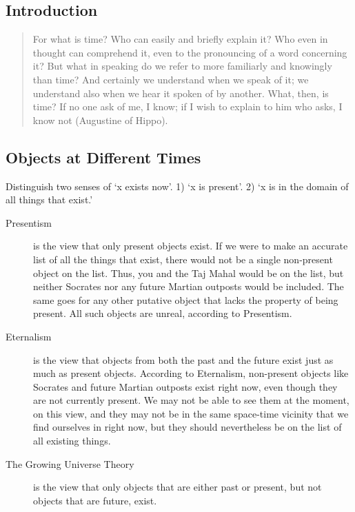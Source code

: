 \documentclass[oneside]{article}
\begin{document}
\thispagestyle{fancy}

\subsection*{Introduction}

\begin{quote}
For what is time? Who can easily and briefly explain it? Who even in thought can comprehend it, even to the pronouncing of a word concerning it? But what in speaking do we refer to more familiarly and knowingly than time? And certainly we understand when we speak of it; we understand also when we hear it spoken of by another. What, then, is time? If no one ask of me, I know; if I wish to explain to him who asks, I know not (Augustine of Hippo). 
\end{quote}

\subsection*{Objects at Different Times}

Distinguish two senses of `x exists now'. 1) `x is present'. 2) `x is in the domain of all things that exist.' 

\begin{description}
\item[Presentism] is the view that only present objects exist. If we were to make an accurate list of all the things that exist, there would not be a single non-present object on the list. Thus, you and the Taj Mahal would be on the list, but neither Socrates nor any future Martian outposts would be included. The same goes for any other putative object that lacks the property of being present. All such objects are unreal, according to Presentism.
\item[Eternalism] is the view that objects from both the past and the future exist just as much as present objects. According to Eternalism, non-present objects like Socrates and future Martian outposts exist right now, even though they are not currently present. We may not be able to see them at the moment, on this view, and they may not be in the same space-time vicinity that we find ourselves in right now, but they should nevertheless be on the list of all existing things.
\item[The Growing Universe Theory] is the view that only objects that are either past or present, but not objects that are future, exist. 
\end{description}
\end{document}
